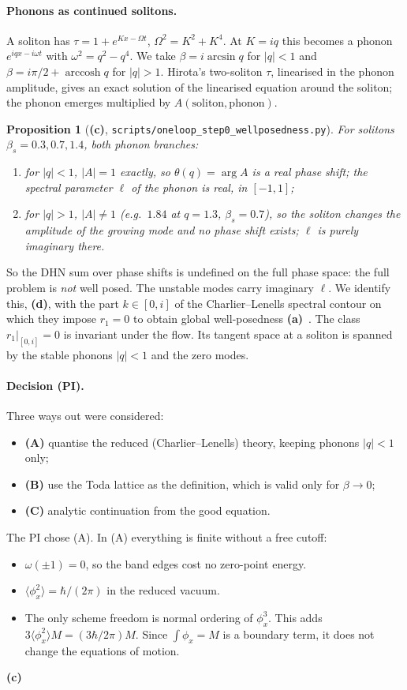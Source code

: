 \documentclass[11pt,a4paper]{article}
\newcommand{\La}{\textsf{\textbf{(a)}}}
\newcommand{\Lc}{\textsf{\textbf{(c)}}}
\newcommand{\Ld}{\textsf{\textbf{(d)}}}
\newcommand{\script}[1]{\texttt{scripts/#1}}
\newtheorem{proposition}{Proposition}[section]
\theoremstyle{remark}\newtheorem{remark}[proposition]{Remark}
\begin{document}
\paragraph{Phonons as continued solitons.} A soliton has $\tau=1+e^{Kx-\Omega t}$, $\Omega^2=K^2+K^4$. At $K=iq$ this becomes a phonon $e^{iqx-i\omega t}$ with $\omega^2=q^2-q^4$. We take $\beta=i\arcsin q$ for $|q|<1$ and $\beta=i\pi/2+\operatorname{arccosh}q$ for $|q|>1$. Hirota's two-soliton $\tau$, linearised in the phonon amplitude, gives an exact solution of the linearised equation around the soliton; the phonon emerges multiplied by $A(\text{soliton},\text{phonon})$.

\begin{proposition}[\Lc, \script{oneloop\_step0\_wellposedness.py}]\label{prop:step0}
For solitons $\beta_s=0.3,0.7,1.4$, both phonon branches:
\begin{enumerate}
\item for $|q|<1$, $|A|=1$ exactly, so $\theta(q)=\arg A$ is a real phase shift; the spectral parameter $\ell$ of the phonon is real, in $[-1,1]$;
\item for $|q|>1$, $|A|\neq1$ (e.g.\ $1.84$ at $q=1.3$, $\beta_s=0.7$), so the soliton changes the \emph{amplitude} of the growing mode and no phase shift exists; $\ell$ is purely imaginary there.
\end{enumerate}
\end{proposition}
So the DHN sum over phase shifts is undefined on the full phase space: the full problem is \emph{not} well posed. The unstable modes carry imaginary $\ell$. We identify this, \Ld, with the part $k\in[0,i]$ of the Charlier--Lenells spectral contour on which they impose $r_1=0$ to obtain global well-posedness \La~\cite{CL-WW,CL-SOL}. The class $r_1|_{[0,i]}=0$ is invariant under the flow. Its tangent space at a soliton is spanned by the stable phonons $|q|<1$ and the zero modes.

\paragraph{Decision (PI).} Three ways out were considered:
\begin{itemize}
\item \textbf{(A)} quantise the reduced (Charlier--Lenells) theory, keeping phonons $|q|<1$ only;
\item \textbf{(B)} use the Toda lattice as the definition, which is valid only for $\beta\to0$;
\item \textbf{(C)} analytic continuation from the good equation.
\end{itemize}
The PI chose (A). In (A) everything is finite without a free cutoff:
\begin{itemize}
\item $\omega(\pm1)=0$, so the band edges cost no zero-point energy.
\item $\langle\phi_x^2\rangle=\hbar/(2\pi)$ in the reduced vacuum.
\item The only scheme freedom is normal ordering of $\phi_x^3$. This adds $3\langle\phi_x^2\rangle M=(3\hbar/2\pi)M$. Since $\int\phi_x=M$ is a boundary term, it does not change the equations of motion.
\end{itemize}
\Lc
\end{document}
